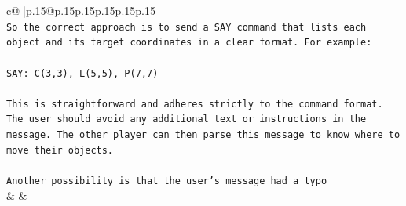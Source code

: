 \documentclass{article}
\begin{document}
{\begin{supertabular}{c@{$\;$}|p{.15\linewidth}@{}p{.15\linewidth}p{.15\linewidth}p{.15\linewidth}p{.15\linewidth}p{.15\linewidth}}
{{{\\ 
\texttt{So the correct approach is to send a SAY command that lists each object and its target coordinates in a clear format. For example:} \\
\\ 
\texttt{SAY: C(3,3), L(5,5), P(7,7)} \\
\\ 
\texttt{This is straightforward and adheres strictly to the command format. The user should avoid any additional text or instructions in the message. The other player can then parse this message to know where to move their objects.} \\
\\ 
\texttt{Another possibility is that the user's message had a typo} \\
            }
        }
    }
    & & \\ \\


\end{supertabular}}
\end{document}
